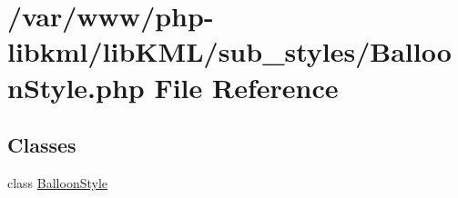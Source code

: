 \hypertarget{BalloonStyle_8php}{
\section{/var/www/php-\/libkml/libKML/sub\_\-styles/BalloonStyle.php File Reference}
\label{dc/dd1/BalloonStyle_8php}
}
\subsection*{Classes}
\begin{DoxyCompactItemize}
\item 
class \hyperlink{classBalloonStyle}{BalloonStyle}
\end{DoxyCompactItemize}
